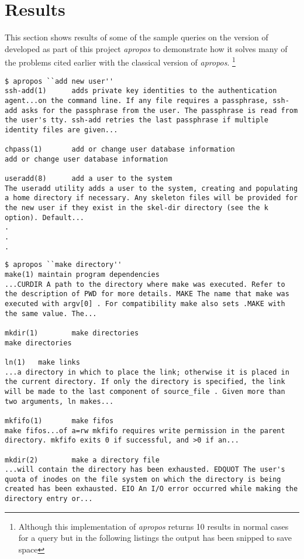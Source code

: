 \documentclass[titlepage, a4paper, 12pt]{article}
\begin{document}
\section{Results}
This section shows results of some of the sample queries on the version of
developed as part of this project
\textit{apropos} to demonstrate how it solves many of the problems cited earlier
with the classical version of \textit{apropos}.
\footnote{Although this implementation of \textit{apropos} returns 10 results
in normal cases for a query but in the following listings the output has been
snipped to save space
}
\begin{lstlisting}
$ apropos ``add new user''
ssh-add(1)      adds private key identities to the authentication agent...on the command line. If any file requires a passphrase, ssh-add asks for the passphrase from the user. The passphrase is read from the user's tty. ssh-add retries the last passphrase if multiple identity files are given...

chpass(1)       add or change user database information
add or change user database information

useradd(8)      add a user to the system
The useradd utility adds a user to the system, creating and populating a home directory if necessary. Any skeleton files will be provided for the new user if they exist in the skel-dir directory (see the k option). Default...
.
.
.
\end{lstlisting}
\begin{lstlisting}
$ apropos ``make directory''
make(1) maintain program dependencies
...CURDIR A path to the directory where make was executed. Refer to the description of PWD for more details. MAKE The name that make was executed with argv[0] . For compatibility make also sets .MAKE with the same value. The...

mkdir(1)        make directories
make directories

ln(1)   make links
...a directory in which to place the link; otherwise it is placed in the current directory. If only the directory is specified, the link will be made to the last component of source_file . Given more than two arguments, ln makes...

mkfifo(1)       make fifos
make fifos...of a=rw mkfifo requires write permission in the parent directory. mkfifo exits 0 if successful, and >0 if an...

mkdir(2)        make a directory file
...will contain the directory has been exhausted. EDQUOT The user's quota of inodes on the file system on which the directory is being created has been exhausted. EIO An I/O error occurred while making the directory entry or...
\end{lstlisting}
\end{document}
